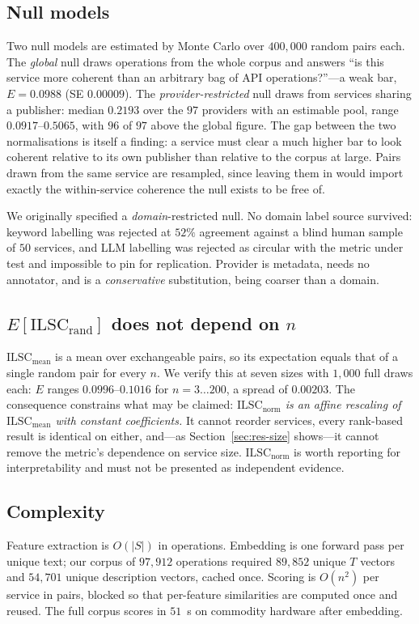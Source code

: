 \documentclass[journal]{IEEEtran}
\newcommand{\ilscm}{\ensuremath{\mathrm{ILSC}_{\mathrm{mean}}}}
\newcommand{\ilscn}{\ensuremath{\mathrm{ILSC}_{\mathrm{norm}}}}
\begin{document}
\subsection{Null models}
Two null models are estimated by Monte Carlo over $400{,}000$ random pairs each.
The \emph{global} null draws operations from the whole corpus and answers ``is
this service more coherent than an arbitrary bag of API operations?''---a weak
bar, $E=0.0988$ (SE $0.00009$). The \emph{provider-restricted} null draws from
services sharing a publisher: median $0.2193$ over the $97$ providers with an
estimable pool, range $0.0917$--$0.5065$, with $96$ of $97$ above the global
figure. The gap between the two normalisations is itself a finding: a service
must clear a much higher bar to look coherent relative to its own publisher than
relative to the corpus at large. Pairs drawn from the same service are resampled,
since leaving them in would import exactly the within-service coherence the null
exists to be free of.

We originally specified a \emph{domain}-restricted null. No domain label source
survived: keyword labelling was rejected at $52\%$ agreement against a blind
human sample of $50$ services, and LLM labelling was rejected as circular with
the metric under test and impossible to pin for replication. Provider is
metadata, needs no annotator, and is a \emph{conservative} substitution, being
coarser than a domain.

\subsection{$E[\mathrm{ILSC_{rand}}]$ does not depend on $n$}
\label{sec:flat-null}
$\ilscm$ is a mean over exchangeable pairs, so its expectation equals that of a
single random pair for every $n$. We verify this at seven sizes with $1{,}000$
full draws each: $E$ ranges $0.0996$--$0.1016$ for $n=3\ldots200$, a spread of
$0.00203$. The consequence constrains what may be claimed: \emph{$\ilscn$ is an
affine rescaling of $\ilscm$ with constant coefficients.} It cannot reorder
services, every rank-based result is identical on either, and---as
Section~\ref{sec:res-size} shows---it cannot remove the metric's dependence on
service size. $\ilscn$ is worth reporting for interpretability and must not be
presented as independent evidence.

\subsection{Complexity}
Feature extraction is $O(|S|)$ in operations. Embedding is one forward pass per
unique text; our corpus of $97{,}912$ operations required $89{,}852$ unique
$T$ vectors and $54{,}701$ unique description vectors, cached once. Scoring is
$O(n^2)$ per service in pairs, blocked so that per-feature similarities are
computed once and reused. The full corpus scores in $51$~s on commodity
hardware after embedding.
\end{document}
